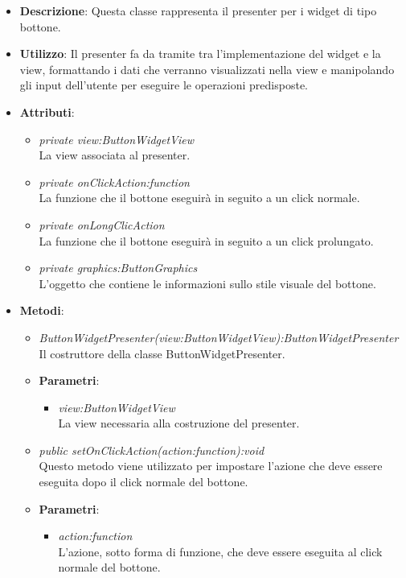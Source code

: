 \begin{itemize}
\item \textbf{Descrizione}: Questa classe rappresenta il presenter per i widget di tipo bottone.
\item \textbf{Utilizzo}: Il presenter fa da tramite tra l'implementazione del widget e la view, formattando i dati che verranno visualizzati nella view e manipolando gli input dell'utente per eseguire le operazioni predisposte.
\item \textbf{Attributi}:
	\begin{itemize}
	\item \textit{private view:ButtonWidgetView}\\
	La view associata al presenter.
	\item \textit{private onClickAction:function}\\
	La funzione che il bottone eseguirà in seguito a un click normale.
	\item \textit{private onLongClicAction}\\
	La funzione che il bottone eseguirà in seguito a un click prolungato.
	\item \textit{private graphics:ButtonGraphics}\\
	L'oggetto che contiene le informazioni sullo stile visuale del bottone.
	\end{itemize}
\item \textbf{Metodi}:
	\begin{itemize}
	\item \textit{ButtonWidgetPresenter(view:ButtonWidgetView):ButtonWidgetPresenter}\\
	Il costruttore della classe ButtonWidgetPresenter.
		\item{\textbf{Parametri}: \begin{itemize}
		\item \textit{view:ButtonWidgetView}\\
		La view necessaria alla costruzione del presenter.
		\end{itemize}}
	\item \textit{public setOnClickAction(action:function):void}\\
	Questo metodo viene utilizzato per impostare l'azione che deve essere eseguita dopo il click normale del bottone.
		\item{\textbf{Parametri}: \begin{itemize}
		\item \textit{action:function}\\
		L'azione, sotto forma di funzione, che deve essere eseguita al click normale del bottone.

\end{itemize}}
\end{itemize}
\end{itemize}
